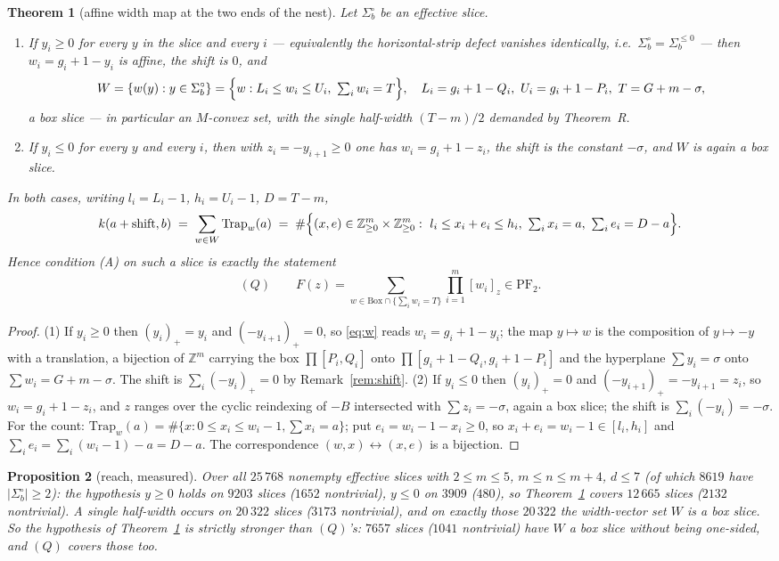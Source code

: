\documentclass[11pt]{article}
\theoremstyle{plain}
\newtheorem{theorem}{Theorem}
\newtheorem{proposition}[theorem]{Proposition}
\theoremstyle{definition}
\newcommand{\PFtwo}{\mathrm{PF}_2}
\newcommand{\Trap}{\mathrm{Trap}}
\newcommand{\Z}{\mathbb{Z}}
\newcommand{\pp}[1]{\left(#1\right)_{+}}
\begin{document}
\begin{theorem}[affine width map at the two ends of the nest]\label{thm:affine}
Let $\Sigma_b^\circ$ be an effective slice.
\begin{enumerate}
\item If $y_i\ge0$ for every $y$ in the slice and every $i$ --- equivalently the
  horizontal-strip defect vanishes identically, i.e.\ $\Sigma_b^\circ=\Sigma_b^{\le0}$ ---
  then $w_i=g_i+1-y_i$ is affine, the shift is $0$, and
  \[
    W=\{w(y):y\in\Sigma_b^\circ\}=\Bigl\{w:L_i\le w_i\le U_i,\ \textstyle\sum_iw_i=T\Bigr\},
    \quad L_i=g_i+1-Q_i,\ U_i=g_i+1-P_i,\ T=G+m-\sigma,
  \]
  a box slice --- in particular an $M$-convex set, with the single half-width
  $(T-m)/2$ demanded by Theorem~R.
\item If $y_i\le0$ for every $y$ and every $i$, then with $z_i=-y_{i+1}\ge0$ one has
  $w_i=g_i+1-z_i$, the shift is the constant $-\sigma$, and $W$ is again a box slice.
\end{enumerate}
In both cases, writing $l_i=L_i-1$, $h_i=U_i-1$, $D=T-m$,
\[
  k(a+\text{shift},b)\;=\;\sum_{w\in W}\Trap_w(a)
  \;=\;\#\Bigl\{(x,e)\in\Z_{\ge0}^m\times\Z_{\ge0}^m:\ l_i\le x_i+e_i\le h_i,\
  \textstyle\sum_ix_i=a,\ \sum_ie_i=D-a\Bigr\}.
\]
Hence condition (A) on such a slice is exactly the statement
\[
  (Q)\qquad F(z)=\sum_{w\in\mathrm{Box}\cap\{\sum_iw_i=T\}}\prod_{i=1}^m[w_i]_z\in\PFtwo .
\]
\end{theorem}

\begin{proof}
(1) If $y_i\ge0$ then $\pp{y_i}=y_i$ and $\pp{-y_{i+1}}=0$, so \eqref{eq:w} reads
$w_i=g_i+1-y_i$; the map $y\mapsto w$ is the composition of $y\mapsto-y$ with a
translation, a bijection of $\Z^m$ carrying the box $\prod[P_i,Q_i]$ onto
$\prod[g_i+1-Q_i,g_i+1-P_i]$ and the hyperplane $\sum y_i=\sigma$ onto
$\sum w_i=G+m-\sigma$. The shift is $\sum_i\pp{-y_i}=0$ by Remark~\ref{rem:shift}.
(2) If $y_i\le0$ then $\pp{y_i}=0$ and $\pp{-y_{i+1}}=-y_{i+1}=z_i$, so
$w_i=g_i+1-z_i$, and $z$ ranges over the cyclic reindexing of $-B$ intersected with
$\sum z_i=-\sigma$, again a box slice; the shift is $\sum_i(-y_i)=-\sigma$.
For the count: $\Trap_w(a)=\#\{x:0\le x_i\le w_i-1,\sum x_i=a\}$; put $e_i=w_i-1-x_i\ge0$,
so $x_i+e_i=w_i-1\in[l_i,h_i]$ and $\sum_i e_i=\sum_i(w_i-1)-a=D-a$. The correspondence
$(w,x)\leftrightarrow(x,e)$ is a bijection.
\end{proof}

\begin{proposition}[reach, measured]\label{prop:reach}
Over all $25\,768$ nonempty effective slices with $2\le m\le5$, $m\le n\le m+4$, $d\le7$
(of which $8619$ have $|\Sigma_b^\circ|\ge2$): the hypothesis $y\ge0$ holds on $9203$
slices ($1652$ nontrivial), $y\le0$ on $3909$ ($480$), so
Theorem~\ref{thm:affine} covers $12\,665$ slices ($2132$ nontrivial). A single half-width
occurs on $20\,322$ slices ($3173$ nontrivial), and on \emph{exactly} those $20\,322$ the
width-vector set $W$ is a box slice. So the hypothesis of Theorem~\ref{thm:affine} is
strictly stronger than $(Q)$'s: $7657$ slices ($1041$ nontrivial) have $W$ a box slice
without being one-sided, and $(Q)$ covers those too.
\end{proposition}
\end{document}
